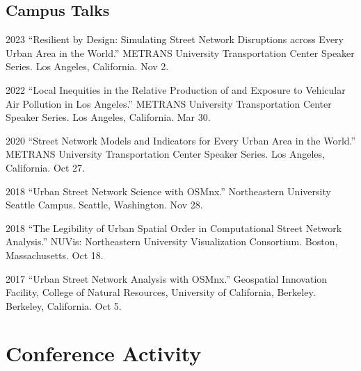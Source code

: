 \documentclass[11pt,letterpaper]{report} %
\begin{document}
    \subsection*{Campus Talks}

    \begin{tablist}


        \item[2023] \tab{}\enquote{Resilient by Design: Simulating Street Network Disruptions across Every Urban Area in the World.} METRANS University Transportation Center Speaker Series. Los Angeles, California. Nov 2.

        \item[2022] \tab{}\enquote{Local Inequities in the Relative Production of and Exposure to Vehicular Air Pollution in Los Angeles.} METRANS University Transportation Center Speaker Series. Los Angeles, California. Mar 30.

        \item[2020] \tab{}\enquote{Street Network Models and Indicators for Every Urban Area in the World.} METRANS University Transportation Center Speaker Series. Los Angeles, California. Oct 27.

        \item[2018] \tab{}\enquote{Urban Street Network Science with OSMnx.} Northeastern University Seattle Campus. Seattle, Washington. Nov 28.

        \item[2018] \tab{}\enquote{The Legibility of Urban Spatial Order in Computational Street Network Analysis.} NUVis: Northeastern University Visualization Consortium. Boston, Massachusetts. Oct 18.

        \item[2017] \tab{}\enquote{Urban Street Network Analysis with OSMnx.} Geospatial Innovation Facility, College of Natural Resources, University of California, Berkeley. Berkeley, California. Oct 5.

    \end{tablist}



    \section*{Conference Activity}
\end{document}

